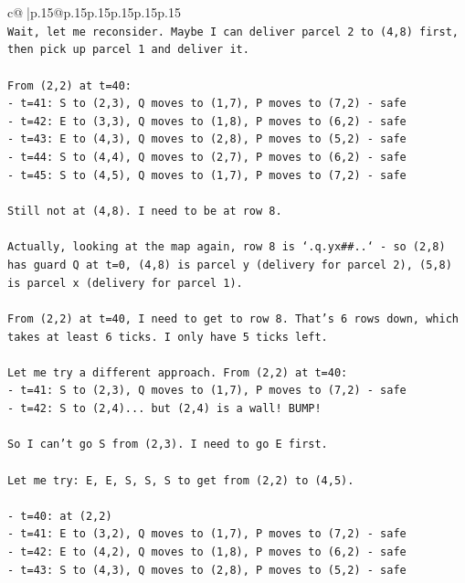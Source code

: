\documentclass{article}
\begin{document}
{\begin{supertabular}{c@{$\;$}|p{.15\linewidth}@{}p{.15\linewidth}p{.15\linewidth}p{.15\linewidth}p{.15\linewidth}p{.15\linewidth}}
{{{\\ 
\texttt{Wait, let me reconsider. Maybe I can deliver parcel 2 to (4,8) first, then pick up parcel 1 and deliver it.} \\
\\ 
\texttt{From (2,2) at t=40:} \\
\texttt{{-} t=41: S to (2,3), Q moves to (1,7), P moves to (7,2) {-} safe} \\
\texttt{{-} t=42: E to (3,3), Q moves to (1,8), P moves to (6,2) {-} safe} \\
\texttt{{-} t=43: E to (4,3), Q moves to (2,8), P moves to (5,2) {-} safe} \\
\texttt{{-} t=44: S to (4,4), Q moves to (2,7), P moves to (6,2) {-} safe} \\
\texttt{{-} t=45: S to (4,5), Q moves to (1,7), P moves to (7,2) {-} safe} \\
\\ 
\texttt{Still not at (4,8). I need to be at row 8.} \\
\\ 
\texttt{Actually, looking at the map again, row 8 is `.q.yx\#\#..` {-} so (2,8) has guard Q at t=0, (4,8) is parcel y (delivery for parcel 2), (5,8) is parcel x (delivery for parcel 1).} \\
\\ 
\texttt{From (2,2) at t=40, I need to get to row 8. That's 6 rows down, which takes at least 6 ticks. I only have 5 ticks left.} \\
\\ 
\texttt{Let me try a different approach. From (2,2) at t=40:} \\
\texttt{{-} t=41: S to (2,3), Q moves to (1,7), P moves to (7,2) {-} safe} \\
\texttt{{-} t=42: S to (2,4)... but (2,4) is a wall! BUMP!} \\
\\ 
\texttt{So I can't go S from (2,3). I need to go E first.} \\
\\ 
\texttt{Let me try: E, E, S, S, S to get from (2,2) to (4,5).} \\
\\ 
\texttt{{-} t=40: at (2,2)} \\
\texttt{{-} t=41: E to (3,2), Q moves to (1,7), P moves to (7,2) {-} safe} \\
\texttt{{-} t=42: E to (4,2), Q moves to (1,8), P moves to (6,2) {-} safe} \\
\texttt{{-} t=43: S to (4,3), Q moves to (2,8), P moves to (5,2) {-} safe} \\
}}}
\end{supertabular}}
\end{document}
